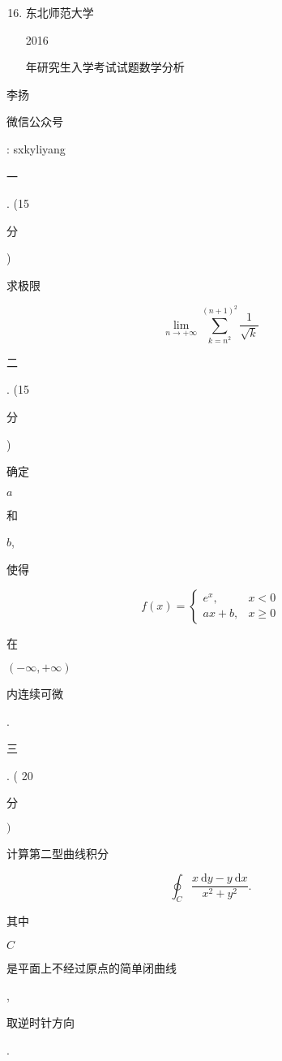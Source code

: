 \documentclass[10pt]{article}
\begin{document}
\begin{enumerate}
  \setcounter{enumi}{15}
  \item \begin{CJK}{UTF8}{mj}东北师范大学\end{CJK} 2016 \begin{CJK}{UTF8}{mj}年研究生入学考试试题数学分析\end{CJK}
\end{enumerate}
\begin{CJK}{UTF8}{mj}李扬\end{CJK}

\begin{CJK}{UTF8}{mj}微信公众号\end{CJK}: sxkyliyang

\begin{CJK}{UTF8}{mj}一\end{CJK}. (15 \begin{CJK}{UTF8}{mj}分\end{CJK}) \begin{CJK}{UTF8}{mj}求极限\end{CJK}
$$
\lim _{n \rightarrow+\infty} \sum_{k=n^{2}}^{(n+1)^{2}} \frac{1}{\sqrt{k}}
$$
\begin{CJK}{UTF8}{mj}二\end{CJK}. (15 \begin{CJK}{UTF8}{mj}分\end{CJK}) \begin{CJK}{UTF8}{mj}确定\end{CJK} $a$ \begin{CJK}{UTF8}{mj}和\end{CJK} $b$, \begin{CJK}{UTF8}{mj}使得\end{CJK}
$$
f(x)= \begin{cases}e^{x}, & x<0 \\ a x+b, & x \geqslant 0\end{cases}
$$
\begin{CJK}{UTF8}{mj}在\end{CJK} $(-\infty,+\infty)$ \begin{CJK}{UTF8}{mj}内连续可微\end{CJK}.

\begin{CJK}{UTF8}{mj}三\end{CJK}. ( 20 \begin{CJK}{UTF8}{mj}分\end{CJK} $)$ \begin{CJK}{UTF8}{mj}计算第二型曲线积分\end{CJK}
$$
\oint_{C} \frac{x \mathrm{~d} y-y \mathrm{~d} x}{x^{2}+y^{2}} .
$$
\begin{CJK}{UTF8}{mj}其中\end{CJK} $C$ \begin{CJK}{UTF8}{mj}是平面上不经过原点的简单闭曲线\end{CJK}, \begin{CJK}{UTF8}{mj}取逆时针方向\end{CJK}.
\end{document}
